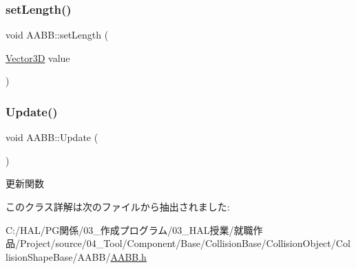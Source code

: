 \subsubsection{\texorpdfstring{set\+Length()}{setLength()}}
{\footnotesize\ttfamily void A\+A\+B\+B\+::set\+Length (\begin{DoxyParamCaption}\item[{\mbox{\hyperlink{class_vector3_d}{Vector3D}}}]{value }\end{DoxyParamCaption})\hspace{0.3cm}{\ttfamily [inline]}}

\mbox{\label{class_a_a_b_b_a9698fec7358275832b6b84a146ea4a7c}} 
\subsubsection{\texorpdfstring{Update()}{Update()}}
{\footnotesize\ttfamily void A\+A\+B\+B\+::\+Update (\begin{DoxyParamCaption}{ }\end{DoxyParamCaption})\hspace{0.3cm}{\ttfamily [inline]}}



更新関数 



このクラス詳解は次のファイルから抽出されました\+:\begin{DoxyCompactItemize}
\item 
C\+:/\+H\+A\+L/\+P\+G関係/03\+\_\+作成プログラム/03\+\_\+\+H\+A\+L授業/就職作品/\+Project/source/04\+\_\+\+Tool/\+Component/\+Base/\+Collision\+Base/\+Collision\+Object/\+Collision\+Shape\+Base/\+A\+A\+B\+B/\mbox{\hyperlink{_a_a_b_b_8h}{A\+A\+B\+B.\+h}}\end{DoxyCompactItemize}
